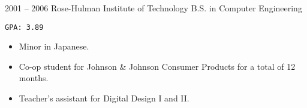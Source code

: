 \documentclass[10pt, letterpaper]{developercv}
\begin{document}

\begin{entrylist}
    \entry
        {2001 -- 2006}
        {Rose-Hulman Institute of Technology}
        {B.S. in Computer Engineering}
        {%
            \texttt{GPA: 3.89}
            \begin{itemize}[nosep]
                \item Minor in Japanese.
                \item Co-op student for Johnson \& Johnson Consumer Products
                    for a total of 12 months.
                \item Teacher's assistant for Digital Design I and II.
            \end{itemize}
        }
\end{entrylist}
\end{document}
